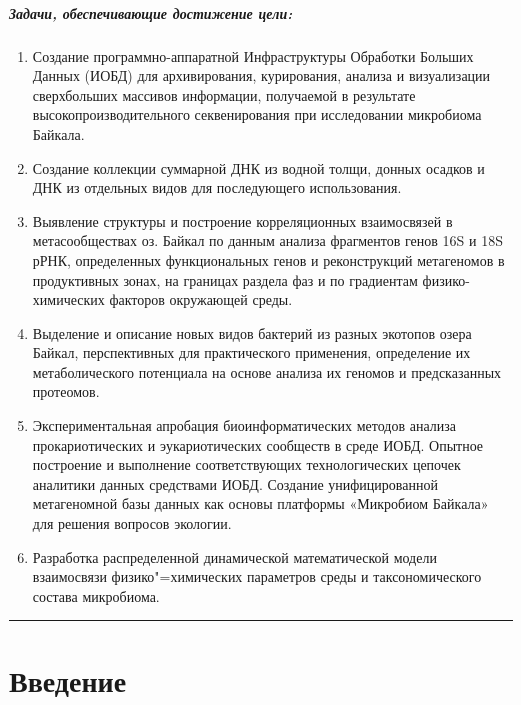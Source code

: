 \documentclass[a4paper,12pt,openany,final]{extreport}
\makeatletter
\def\vhrulefill#1{\leavevmode\leaders\hrule\@height#1\hfill \kern\z@}
\newcommand\bottomrule{\noindent\vhrulefill{2pt}}
\makeatother
\begin{document}
\paragraph{Задачи, обеспечивающие достижение цели:}
\begin{enumerate}
\item Создание программно-аппаратной Инфраструктуры Обработки
  Больших Данных (ИОБД) для архивирования, курирования, анализа и
  визуализации сверхбольших массивов информации, получаемой в
  результате высокопроизводительного секвенирования при исследовании
  микробиома Байкала.

\item  Создание коллекции суммарной ДНК из водной толщи, донных осадков и
ДНК из отдельных видов для последующего использования.

\item  Выявление структуры и построение корреляционных взаимосвязей в
метасообществах оз. Байкал по данным анализа фрагментов генов 16S и 18S
рРНК, определенных функциональных генов и реконструкций метагеномов в
продуктивных зонах, на границах раздела фаз и по градиентам
физико-химических факторов окружающей среды.

\item  Выделение и описание новых видов бактерий из разных экотопов озера
Байкал, перспективных для практического применения, определение их
метаболического потенциала на основе анализа их геномов и предсказанных
протеомов.

\item  Экспериментальная апробация биоинформатических методов анализа
прокариотических и эукариотических сообществ в среде ИОБД. Опытное
построение и выполнение соответствующих технологических цепочек
аналитики данных средствами ИОБД. Создание унифицированной метагеномной
базы данных как основы платформы «Микробиом Байкала» для решения
вопросов экологии.

\item Разработка распределенной динамической математической модели взаимосвязи физико"=химических параметров среды и таксономического состава микробиома.\strut
\end{enumerate}
\bottomrule
\clearpage{}

\chapter*{Введение}
\end{document}
